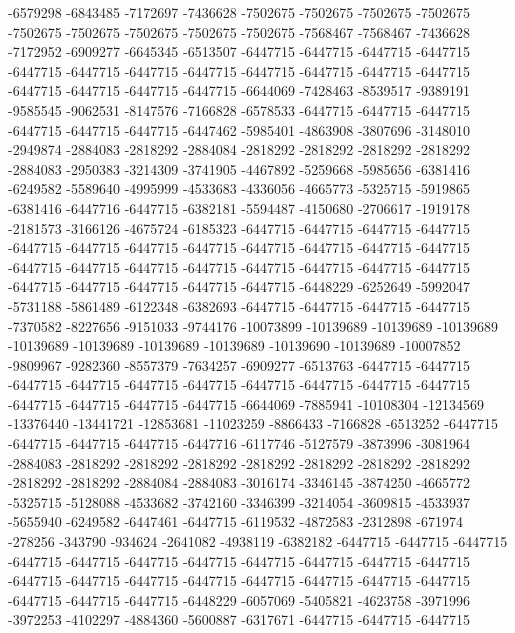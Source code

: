 -6579298 -6843485 -7172697 -7436628 -7502675 -7502675 -7502675 -7502675 -7502675 -7502675 -7502675 -7502675 -7502675 -7568467 -7568467 -7436628 -7172952 -6909277 -6645345 -6513507 -6447715 -6447715 -6447715 -6447715 -6447715 -6447715 -6447715 -6447715 -6447715 -6447715 -6447715 -6447715 -6447715 -6447715 -6447715 -6447715 -6644069 -7428463 -8539517 -9389191 -9585545 -9062531 -8147576 -7166828 -6578533 -6447715 -6447715 -6447715 -6447715 -6447715 -6447715 -6447462 -5985401 -4863908 -3807696 -3148010 -2949874 -2884083 -2818292 -2884084 -2818292 -2818292 -2818292 -2818292 -2884083 -2950383 -3214309 -3741905 -4467892 -5259668 -5985656 -6381416 -6249582 -5589640 -4995999 -4533683 -4336056 -4665773 -5325715 -5919865 -6381416 -6447716 -6447715 -6382181 -5594487 -4150680 -2706617 -1919178 -2181573 -3166126 -4675724 -6185323 -6447715 -6447715 -6447715 -6447715 -6447715 -6447715 -6447715 -6447715 -6447715 -6447715 -6447715 -6447715 -6447715 -6447715 -6447715 -6447715 -6447715 -6447715 -6447715 -6447715 -6447715 -6447715 -6447715 -6447715 -6447715 -6448229 -6252649 -5992047 -5731188 -5861489 -6122348 -6382693 -6447715 -6447715 -6447715 -6447715
-7370582 -8227656 -9151033 -9744176 -10073899 -10139689 -10139689 -10139689 -10139689 -10139689 -10139689 -10139689 -10139690 -10139689 -10007852 -9809967 -9282360 -8557379 -7634257 -6909277 -6513763 -6447715 -6447715 -6447715 -6447715 -6447715 -6447715 -6447715 -6447715 -6447715 -6447715 -6447715 -6447715 -6447715 -6447715 -6644069 -7885941 -10108304 -12134569 -13376440 -13441721 -12853681 -11023259 -8866433 -7166828 -6513252 -6447715 -6447715 -6447715 -6447715 -6447716 -6117746 -5127579 -3873996 -3081964 -2884083 -2818292 -2818292 -2818292 -2818292 -2818292 -2818292 -2818292 -2818292 -2818292 -2884084 -2884083 -3016174 -3346145 -3874250 -4665772 -5325715 -5128088 -4533682 -3742160 -3346399 -3214054 -3609815 -4533937 -5655940 -6249582 -6447461 -6447715 -6119532 -4872583 -2312898 -671974 -278256 -343790 -934624 -2641082 -4938119 -6382182 -6447715 -6447715 -6447715 -6447715 -6447715 -6447715 -6447715 -6447715 -6447715 -6447715 -6447715 -6447715 -6447715 -6447715 -6447715 -6447715 -6447715 -6447715 -6447715 -6447715 -6447715 -6447715 -6448229 -6057069 -5405821 -4623758 -3971996 -3972253 -4102297 -4884360 -5600887 -6317671 -6447715 -6447715 -6447715
